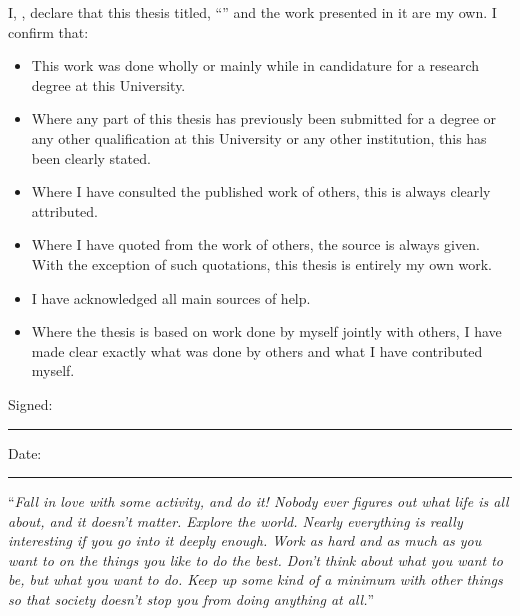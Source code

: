 \documentclass[
11pt, %
english, %
singlespacing, %
headsepline, %
]{utility/MastersDoctoralThesis} %
\begin{document}

\begin{declaration}
\addchaptertocentry{\authorshipname} %
\noindent I, \authorname, declare that this thesis titled, \enquote{\ttitle} and the work presented in it are my own. I confirm that:

\begin{itemize} 
\item This work was done wholly or mainly while in candidature for a research degree at this University.
\item Where any part of this thesis has previously been submitted for a degree or any other qualification at this University or any other institution, this has been clearly stated.
\item Where I have consulted the published work of others, this is always clearly attributed.
\item Where I have quoted from the work of others, the source is always given. With the exception of such quotations, this thesis is entirely my own work.
\item I have acknowledged all main sources of help.
\item Where the thesis is based on work done by myself jointly with others, I have made clear exactly what was done by others and what I have contributed myself.\\
\end{itemize}
 
\noindent Signed:\\
\rule[0.5em]{25em}{0.5pt} %
 
\noindent Date:\\
\rule[0.5em]{25em}{0.5pt} %
\end{declaration}

\cleardoublepage


\vspace*{0.2\textheight}

\noindent\enquote{\itshape Fall in love with some activity, and do it! Nobody ever figures out what life is all about, and it doesn't matter. Explore the world. Nearly everything is really interesting if you go into it deeply enough. Work as hard and as much as you want to on the things you like to do the best. Don't think about what you want to be, but what you want to do. Keep up some kind of a minimum with other things so that society doesn't stop you from doing anything at all.}\bigbreak
\end{document}
